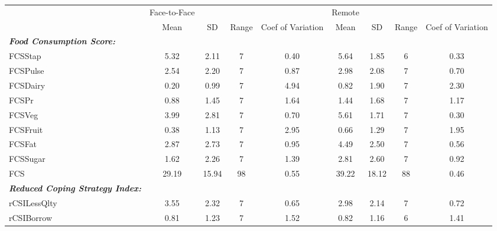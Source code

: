 {
\def\sym#1{\ifmmode^{#1}\else\(^{#1}\)\fi}
\begin{tabular}{l*{2}{cccc}}
\hline\hline
            &Face-to-Face&            &            &            &      Remote&            &            &            \\
            &        Mean&          SD&       Range&Coef of Variation&        Mean&          SD&       Range&Coef of Variation\\
\hline
      \textbf{\textit{Food Consumption Score:}}&            &            &            &            &            &            &            &            \\
FCSStap     &        5.32&        2.11&           7&        0.40&        5.64&        1.85&           6&        0.33\\
FCSPulse    &        2.54&        2.20&           7&        0.87&        2.98&        2.08&           7&        0.70\\
FCSDairy    &        0.20&        0.99&           7&        4.94&        0.82&        1.90&           7&        2.30\\
FCSPr       &        0.88&        1.45&           7&        1.64&        1.44&        1.68&           7&        1.17\\
FCSVeg      &        3.99&        2.81&           7&        0.70&        5.61&        1.71&           7&        0.30\\
FCSFruit    &        0.38&        1.13&           7&        2.95&        0.66&        1.29&           7&        1.95\\
FCSFat      &        2.87&        2.73&           7&        0.95&        4.49&        2.50&           7&        0.56\\
FCSSugar    &        1.62&        2.26&           7&        1.39&        2.81&        2.60&           7&        0.92\\
FCS         &       29.19&       15.94&          98&        0.55&       39.22&       18.12&          88&        0.46\\
      \textbf{\textit{Reduced Coping Strategy Index:}}&            &            &            &            &            &            &            &            \\
rCSILessQlty&        3.55&        2.32&           7&        0.65&        2.98&        2.14&           7&        0.72\\
rCSIBorrow  &        0.81&        1.23&           7&        1.52&        0.82&        1.16&           6&        1.41\\

\end{tabular}}
